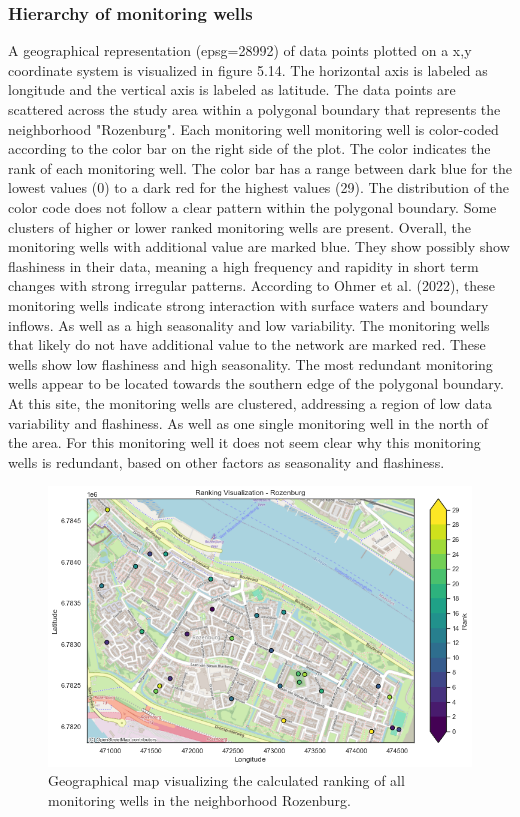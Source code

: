 \subsubsection{Hierarchy of monitoring wells}
A geographical representation (epsg=28992) of data points plotted on a x,y coordinate system is visualized in figure 5.14. The horizontal axis is labeled as longitude and the vertical axis is labeled as latitude. The data points are scattered across the study area within a polygonal boundary that represents the neighborhood "Rozenburg". Each monitoring well monitoring well is color-coded according to the color bar on the right side of the plot. The color indicates the rank of each monitoring well. The color bar has a range between dark blue for the lowest values (0) to a dark red for the highest values (29). The distribution of the color code does not follow a clear pattern within the polygonal boundary. Some clusters of higher or lower ranked monitoring wells are present. Overall, the monitoring wells with additional value are marked blue. They show possibly show flashiness in their data, meaning a high frequency and rapidity in short term changes with strong irregular patterns. According to Ohmer et al. (2022), these monitoring wells indicate strong interaction with surface waters and boundary inflows. As well as a high seasonality and low variability. The monitoring wells that likely do not have additional value to the network are marked red. These wells show low flashiness and high seasonality. The most redundant monitoring wells appear to be located towards the southern edge of the polygonal boundary. At this site, the monitoring wells are clustered, addressing a region of low data variability and flashiness. As well as one single monitoring well in the north of the area. For this monitoring well it does not seem clear why this monitoring wells is redundant, based on other factors as seasonality and flashiness. 

\begin{figure}[h]
    \centering
    \includegraphics[width=0.80\linewidth]{figures/res roz/opthydro/ranking vis_roz.png}
    \caption{Geographical map visualizing the calculated ranking of all monitoring wells in the neighborhood Rozenburg.}
\end{figure} 


